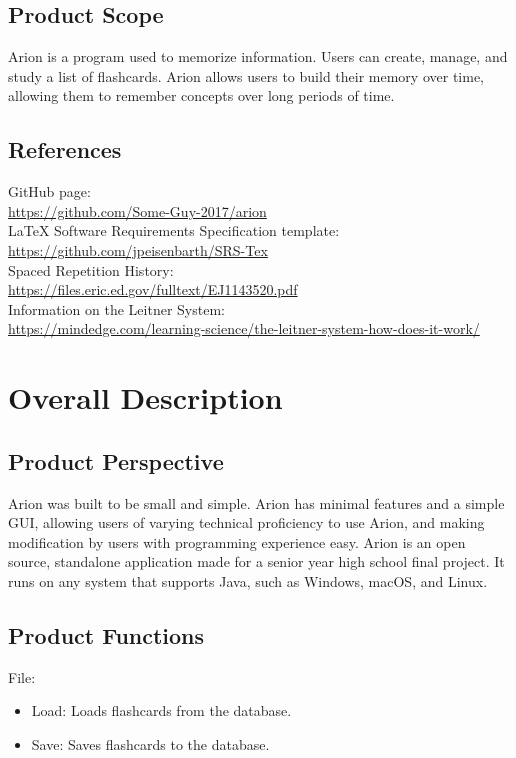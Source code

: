 \documentclass{scrreprt}
\begin{document}
\section{Product Scope}
Arion is a program used to memorize information. Users can create, manage, and study a list of flashcards.
Arion allows users to build their memory over time, allowing them to remember concepts over long periods of time.

\section{References}
\begin{flushleft} 
    GitHub page: \\
    \url{https://github.com/Some-Guy-2017/arion} \\
    LaTeX Software Requirements Specification template: \\
    \url{https://github.com/jpeisenbarth/SRS-Tex} \\
    Spaced Repetition History: \\
    \url{https://files.eric.ed.gov/fulltext/EJ1143520.pdf} \\
    Information on the Leitner System: \\
    \url{https://mindedge.com/learning-science/the-leitner-system-how-does-it-work/} \\
\end{flushleft}


\chapter{Overall Description}

\section{Product Perspective}
Arion was built to be small and simple.
Arion has minimal features and a simple GUI, allowing users of varying technical proficiency to use Arion,
and making modification by users with programming experience easy.
Arion is an open source, standalone application made for a senior year high school final project.
It runs on any system that supports Java, such as Windows, macOS, and Linux.

\section{Product Functions}
\label{sec:Product-Functions}
File:
\begin{itemize}
    \item Load: Loads flashcards from the database.
    \item Save: Saves flashcards to the database.
\end{itemize}
\end{document}
